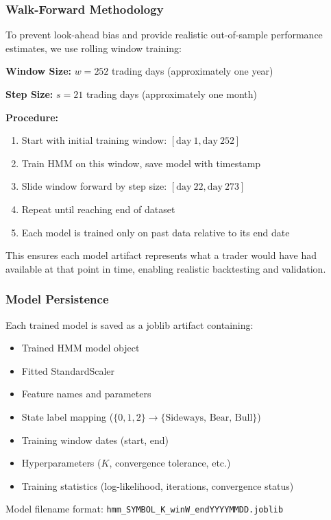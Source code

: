\documentclass[conference]{IEEEtran}
\begin{document}
\subsubsection{Walk-Forward Methodology}
To prevent look-ahead bias and provide realistic out-of-sample performance estimates, we use rolling window training:

\textbf{Window Size:} $w = 252$ trading days (approximately one year)

\textbf{Step Size:} $s = 21$ trading days (approximately one month)

\textbf{Procedure:}
\begin{enumerate}
\item Start with initial training window: $[\text{day}\ 1, \text{day}\ 252]$
\item Train HMM on this window, save model with timestamp
\item Slide window forward by step size: $[\text{day}\ 22, \text{day}\ 273]$
\item Repeat until reaching end of dataset
\item Each model is trained only on past data relative to its end date
\end{enumerate}

This ensures each model artifact represents what a trader would have had available at that point in time, enabling realistic backtesting and validation.

\subsubsection{Model Persistence}
Each trained model is saved as a joblib artifact containing:
\begin{itemize}
\item Trained HMM model object
\item Fitted StandardScaler
\item Feature names and parameters
\item State label mapping ($\{0, 1, 2\} \rightarrow \{\text{Sideways, Bear, Bull}\}$)
\item Training window dates (start, end)
\item Hyperparameters ($K$, convergence tolerance, etc.)
\item Training statistics (log-likelihood, iterations, convergence status)
\end{itemize}

Model filename format: \texttt{hmm\_SYMBOL\_K\_winW\_endYYYYMMDD.joblib}
\end{document}
